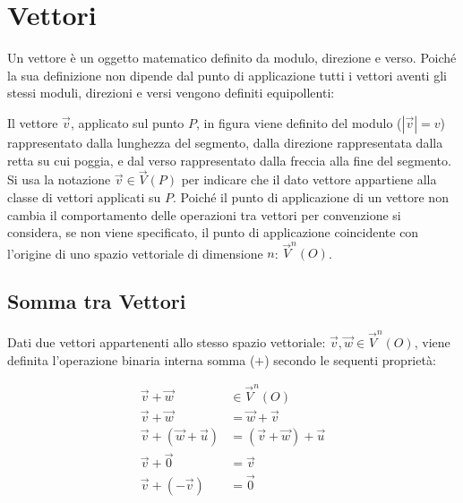 \documentclass{article}
\numberwithin{equation}{subsection}
\begin{document}
\clearpage

\section{Vettori}
Un vettore è un oggetto matematico definito da modulo, direzione e verso. Poiché la sua definizione non dipende dal punto di applicazione tutti i vettori aventi gli stessi moduli, direzioni e versi vengono definiti equipollenti:

\begin{center}\end{center}

Il vettore $\vec{v}$, applicato sul punto $P$, in figura viene definito del modulo ($|\vec{v}| = v$) rappresentato dalla lunghezza del segmento, dalla direzione rappresentata dalla retta su cui poggia, e dal verso rappresentato dalla freccia alla fine del segmento.
Si usa la notazione $\vec{v}\in\vec{V}{\left(P\right)}$ per indicare che  il dato vettore appartiene alla classe di vettori applicati su $P$. Poich\'{e} il punto di applicazione di un vettore non cambia il comportamento delle operazioni tra vettori per convenzione si considera, se non viene specificato, il punto di applicazione coincidente con l'origine di uno spazio vettoriale di dimensione $n$: $\vec{V}^{n}\left(O\right)$.

\subsection{Somma tra Vettori}
Dati due vettori appartenenti allo stesso spazio vettoriale: $\vec{v}, \vec{w} \in \vec{V}^{n}\left(O\right)$, viene definita l'operazione binaria interna somma ($+$) secondo le sequenti proprietà:

\begin{align*}
    \vec{v} + \vec{w} &\in \vec{V}^{n}\left(O\right)\\
    \vec{v} + \vec{w} &= \vec{w} + \vec{v}\\
    \vec{v} + \left(\vec{w} + \vec{u}\right) &= \left(\vec{v} + \vec{w}\right) + \vec{u}\\
    \vec{v} + \vec{0} &= \vec{v}\\ 
    \vec{v} + (-\vec{v}) &= \vec{0}
\end{align*}
\end{document}
